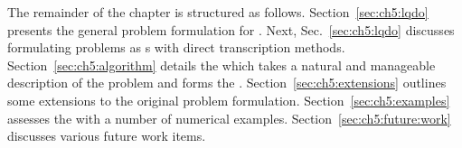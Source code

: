 The remainder of the chapter is structured as follows.
Section~\ref{sec:ch5:lqdo} presents the general problem formulation for \lqdo.
Next, Sec.~\ref{sec:ch5:lqdo} discusses formulating \lqdo{} problems as {\qp}s with direct transcription methods. 
Section~\ref{sec:ch5:algorithm} details the \apgp{} which takes a natural and manageable description of the problem and forms the \qp.
Section~\ref{sec:ch5:extensions} outlines some extensions to the original \lqdo{} problem formulation.
Section~\ref{sec:ch5:examples} assesses the \apgp{} with a number of numerical examples.
Section~\ref{sec:ch5:future:work} discusses various future work items.